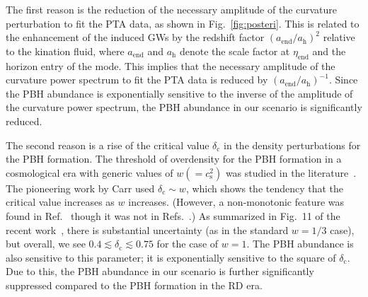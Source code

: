 \documentclass[superscriptaddress, aps, preprintnumbers,
amsmath, amssymb, sort&compress, nofootinbib, 10pt, paper, floatfix]{revtex4-2}
\newcommand{\hh}{\text{h}}
\newcommand{\en}{{\text{end}}}
\begin{document}
The first reason is the reduction of the necessary amplitude of the curvature perturbation to fit the PTA data, as shown in Fig.~\ref{fig:posteri}. 
This is related to the enhancement of the induced GWs by the redshift factor $(a_\en/a_\text{h})^2$ relative to the kination fluid, where $a_\en$ and $a_\hh$ denote the scale factor at $\eta_\en$ and the horizon entry of the mode.  
This implies that the necessary amplitude of the curvature power spectrum to fit the PTA data is reduced by $(a_\en/a_\text{h})^{-1}$. Since the PBH abundance is exponentially sensitive to the inverse of the amplitude of the curvature power spectrum, the PBH abundance in our scenario is significantly reduced.

The second reason is a rise of the critical value $\delta_\text{c}$ in the density perturbations for the PBH formation. The threshold of overdensity for the PBH formation in a cosmological era with generic values of $w(= c_\text{s}^2)$ was studied in the literature~\cite{Carr:1975qj, Musco:2012au, Harada:2013epa, Escriva:2020tak}. The pioneering work by Carr used $\delta_\text{c} \sim w$, which shows the tendency that the critical value increases as $w$ increases. (However, a non-monotonic feature was found in Ref.~\cite{Harada:2013epa} though it was not in Refs.~\cite{Musco:2012au,  Escriva:2020tak}.)  As summarized in Fig.~11 of the recent work~\cite{Escriva:2020tak}, there is substantial uncertainty (as in the standard $w=1/3$ case), but overall, we see $0.4 \lesssim \delta_\text{c} \lesssim 0.75$ for the case of $w=1$. The PBH abundance is also sensitive to this parameter; it is exponentially sensitive to the square of $\delta_\text{c}$. Due to this, the PBH abundance in our scenario is further significantly suppressed compared to the PBH formation in the RD era.
\end{document}

